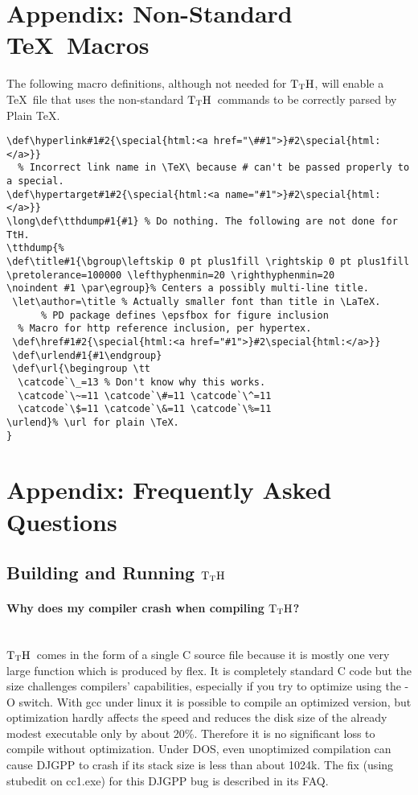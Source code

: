 \documentclass[12pt]{article}
\def\tthdump{}
\def\TtH{$\rm{}T_TH$}
\begin{document}
\appendix
\section{Appendix: Non-Standard \TeX\ Macros}

The following macro definitions, although not needed for \TtH, will
enable a \TeX\ file that uses the non-standard \TtH\ commands to be
correctly parsed by Plain \TeX.

{\begin{verbatim}
\def\hyperlink#1#2{\special{html:<a href="\##1">}#2\special{html:</a>}}
  % Incorrect link name in \TeX\ because # can't be passed properly to a special.
\def\hypertarget#1#2{\special{html:<a name="#1">}#2\special{html:</a>}}
\long\def\tthdump#1{#1} % Do nothing. The following are not done for TtH.
\tthdump{%
\def\title#1{\bgroup\leftskip 0 pt plus1fill \rightskip 0 pt plus1fill
\pretolerance=100000 \lefthyphenmin=20 \righthyphenmin=20
\noindent #1 \par\egroup}% Centers a possibly multi-line title.
 \let\author=\title % Actually smaller font than title in \LaTeX.
      % PD package defines \epsfbox for figure inclusion
  % Macro for http reference inclusion, per hypertex.
 \def\href#1#2{\special{html:<a href="#1">}#2\special{html:</a>}}
 \def\urlend#1{#1\endgroup}
 \def\url{\begingroup \tt 
  \catcode`\_=13 % Don't know why this works.
  \catcode`\~=11 \catcode`\#=11 \catcode`\^=11 
  \catcode`\$=11 \catcode`\&=11 \catcode`\%=11
\urlend}% \url for plain \TeX.
}
\end{verbatim} }


\section{Appendix: Frequently Asked Questions}
\label{FAQ}

\subsection{Building and Running \TtH}

\paragraph{Why does my compiler crash when compiling \TtH?}
\leavevmode\\ \TtH\ comes in the form of a single C source file
because it is mostly one very large function which is produced by
flex. It is completely standard C code but the size challenges
compilers' capabilities, especially if you try to optimize using the
-O switch. With gcc under linux it is possible to compile an optimized
version, but optimization hardly affects the speed and reduces the
disk size of the already modest executable only by about
20\%. Therefore it is no significant loss to compile without
optimization. Under DOS, even unoptimized compilation can cause DJGPP
to crash if its stack size is less than about 1024k. The fix (using
stubedit on cc1.exe) for this DJGPP bug is described in its FAQ.
\end{document}
